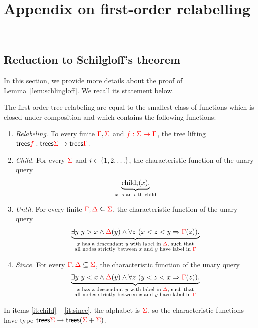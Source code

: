 \section{Appendix on first-order relabelling}~\label{sec:AppendixForat}


\subsection{Reduction to Schilgloff's theorem}

In this section, we provide more details about the proof of Lemma~\ref{lem:schlingloff}. We recall its statement below.

\begin{lemma} \label{restatelem:Schlingloff}The first-order tree relabeling are equal to the smallest class of functions which is closed under composition and which  contains the following functions:
    \begin{enumerate}
        \item \label{it:relabeling} \emph{Relabeling}. To every finite ${\color{red}{\Gamma}},{\color{red}{\Sigma}}$ and ${\color{red}{f : {\color{red}{\Sigma}}\to {\color{red}{\Gamma}}}}$, the tree lifting $\mathsf {trees} {\color{red}{f}} : \mathsf {trees} {\color{red}{\Sigma}} \to \mathsf {trees} {\color{red}{\Gamma}}$.
        \item \label{it:child} \emph{Child.} For every ${\color{red}{\Sigma}}$ and  $i \in \{1,2,\ldots\}$, the characteristic function of the  unary query 
        \begin{align*}
            \underbrace{\mathrm{child}_{i} (x).}_{\text{$x$ is an $i$-th child}}
        \end{align*}
         \item \label{it:until} \emph{Until.} For every finite ${\color{red}{\Gamma}}, {\color{red}{\Delta}} \subseteq {\color{red}{\Sigma}}$,  the characteristic function of the unary query
         \begin{align*}
              \underbrace{\exists y\ y > x \land {\color{red}{\Delta}}(y) \land  \forall z \ (x < z < y \Rightarrow {\color{red}{\Gamma}}(z)).}_{\substack{\text{$x$ has a descendant $y$ with label in ${\color{red}{\Delta}}$, such that}\\ \text{all nodes strictly between $x$ and $y$ have label in ${\color{red}{\Gamma}}$}}} 
         \end{align*} 
         \item \label{it:since}\emph{Since.} For every ${\color{red}{\Gamma}}, {\color{red}{\Delta}} \subseteq {\color{red}{\Sigma}}$,    the characteristic function of the unary query
         \begin{align*}
              \underbrace{\exists y\ y < x \land {\color{red}{\Delta}}(y) \land  \forall z \ (y < z < x \Rightarrow {\color{red}{\Gamma}}(z)).}_{\substack{\text{$x$ has a descendant $y$ with label in ${\color{red}{\Delta}}$, such that}\\ \text{all nodes strictly between $x$ and $y$ have label in ${\color{red}{\Gamma}}$}}}  
         \end{align*} 
    \end{enumerate}
    In items \ref{it:child} -- \ref{it:since}, the alphabet is ${\color{red}{\Sigma}}$, so the characteristic functions have type $\mathsf {trees} {\color{red}{\Sigma}} \to \mathsf {trees}({\color{red}{\Sigma}} + {\color{red}{\Sigma}})$. 
\end{lemma}
